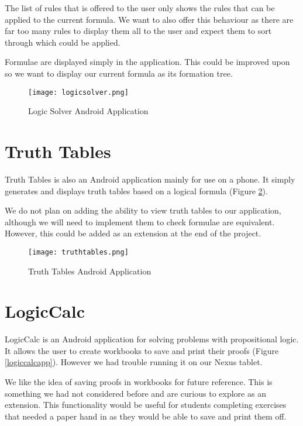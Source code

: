 \documentclass{report}
\begin{document}
The list of rules that is offered to the user only shows the rules that can be applied to the current formula. We want to also offer this behaviour as there are far too many rules to display them all to the user and expect them to sort through which could be applied.

Formulae are displayed simply in the application. This could be improved upon so we want to display our current formula as its formation tree.

\begin{figure}[ht!]
    \centering
    \texttt{[image: logicsolver.png]}
    \caption{Logic Solver Android Application}
    \label{logicsolver}
\end{figure}

\section{Truth Tables}

Truth Tables is also an Android application mainly for use on a phone. It simply generates and displays truth tables based on a logical formula (Figure \ref{truthtables}).

We do not plan on adding the ability to view truth tables to our application, although we will need to implement them to check formulae are equivalent. However, this could be added as an extension at the end of the project.

\begin{figure}[ht!]
    \centering
    \texttt{[image: truthtables.png]}
    \caption{Truth Tables Android Application}
    \label{truthtables}
\end{figure}

\section{LogicCalc}

LogicCalc is an Android application for solving problems with propositional logic. It allows the user to create workbooks to save and print their proofs (Figure \ref{logiccalcapp}). However we had trouble running it on our Nexus tablet.

We like the idea of saving proofs in workbooks for future reference. This is something we had not considered before and are curious to explore as an extension. This functionality would be useful for students completing exercises that needed a paper hand in as they would be able to save and print them off.
\end{document}
